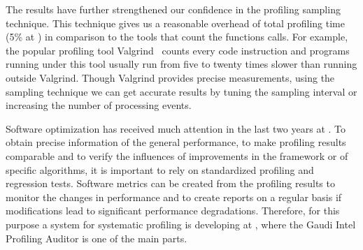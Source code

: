 The results have further strengthened our confidence in the profiling sampling
technique. This technique gives us a reasonable overhead of total profiling
time (5\% at \iamp) in comparison to the tools that count the functions calls.
For example, the popular profiling tool Valgrind~\cite{valgrind} counts every
code instruction and programs running under this tool usually run from five to
twenty times  slower than running outside Valgrind. Though Valgrind provides
precise measurements, using the sampling technique we can get accurate results
by tuning the sampling interval or increasing the number of processing events.

Software optimization has received much attention in the last two years at
\lhcb. To obtain precise information of the general performance, to make
profiling results comparable and to verify the influences of improvements in
the framework or of specific algorithms, it is important to rely on
standardized profiling and regression tests. Software metrics can be created
from the profiling results to monitor the changes in performance and to create
reports on a regular basis if modifications lead to significant
performance degradations. Therefore, for this purpose a system for systematic
profiling is developing at \lhcb, where the Gaudi Intel Profiling Auditor
is one of the main parts.
